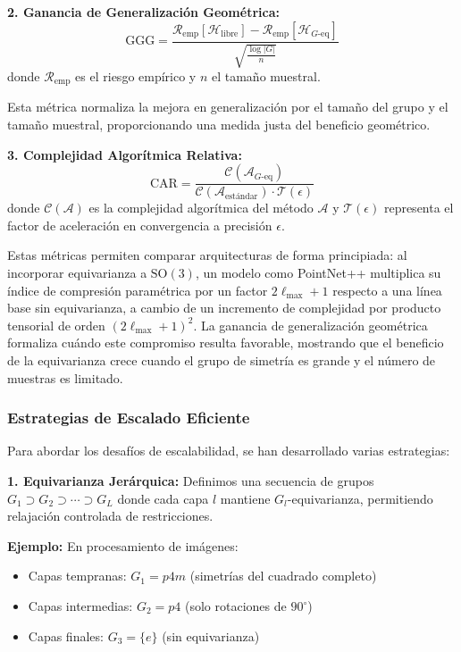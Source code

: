 \textbf{2. Ganancia de Generalización Geométrica:}
\begin{equation}
\text{GGG} = \frac{\mathcal{R}_{\text{emp}}[\mathcal{H}_{\text{libre}}] - \mathcal{R}_{\text{emp}}[\mathcal{H}_{G\text{-eq}}]}{\sqrt{\frac{\log |G|}{n}}}
\end{equation}
donde $\mathcal{R}_{\text{emp}}$ es el riesgo empírico y $n$ el tamaño muestral.

Esta métrica normaliza la mejora en generalización por el tamaño del grupo y el tamaño muestral, proporcionando una medida justa del beneficio geométrico.

\textbf{3. Complejidad Algorítmica Relativa:}
\begin{equation}
\text{CAR} = \frac{\mathcal{C}(\mathcal{A}_{G\text{-eq}})}{\mathcal{C}(\mathcal{A}_{\text{estándar}}) \cdot \mathcal{T}(\epsilon)}
\end{equation}
donde $\mathcal{C}(\mathcal{A})$ es la complejidad algorítmica del método $\mathcal{A}$ y $\mathcal{T}(\epsilon)$ representa el factor de aceleración en convergencia a precisión $\epsilon$.

Estas métricas permiten comparar arquitecturas de forma principiada: al incorporar equivarianza a $\text{SO}(3)$, un modelo como PointNet++ multiplica su índice de compresión paramétrica por un factor $2\ell_{\max}+1$ respecto a una línea base sin equivarianza, a cambio de un incremento de complejidad por producto tensorial de orden $(2\ell_{\max}+1)^2$. La ganancia de generalización geométrica formaliza cuándo este compromiso resulta favorable, mostrando que el beneficio de la equivarianza crece cuando el grupo de simetría es grande y el número de muestras es limitado.

\subsubsection{Estrategias de Escalado Eficiente}

Para abordar los desafíos de escalabilidad, se han desarrollado varias estrategias:

\textbf{1. Equivarianza Jerárquica:} Definimos una secuencia de grupos $G_1 \supset G_2 \supset \cdots \supset G_L$ donde cada capa $l$ mantiene $G_l$-equivarianza, permitiendo relajación controlada de restricciones.

\textbf{Ejemplo:} En procesamiento de imágenes:
\begin{itemize}
\item Capas tempranas: $G_1 = p4m$ (simetrías del cuadrado completo)
\item Capas intermedias: $G_2 = p4$ (solo rotaciones de $90^\circ$)
\item Capas finales: $G_3 = \{e\}$ (sin equivarianza)
\end{itemize}

